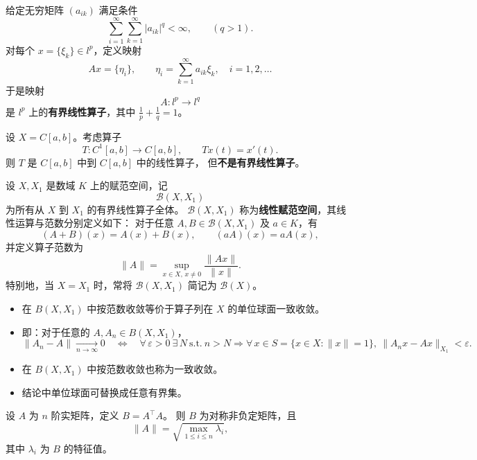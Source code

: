 \begin{example}[例 3.1.3]
给定无穷矩阵 $(a_{ik})$ 满足条件
\[
\sum_{i=1}^{\infty}\sum_{k=1}^{\infty}|a_{ik}|^q<\infty,\qquad (q>1).
\]
对每个 $x=\{\xi_k\}\in l^p$，定义映射
\[
A x = \{\eta_i\},\qquad \eta_i=\sum_{k=1}^{\infty}a_{ik}\xi_k,\quad i=1,2,\dots
\]
于是映射
\[
A:l^p \longrightarrow l^q
\]
是 $l^p$ 上的\textbf{有界线性算子}，其中 $\frac{1}{p}+\frac{1}{q}=1$。
\end{example}

\begin{example}[例 3.1.4（反例）]
设 $X=C[a,b]$。考虑算子
\[
T:C^1[a,b]\to C[a,b],\qquad T x(t)=x'(t).
\]
则 $T$ 是 $C[a,b]$ 中到 $C[a,b]$ 中的线性算子，
但\textbf{不是有界线性算子}。
\end{example}
\begin{definition}[有界线性算子空间]\label{def:bounded-operator-space}
设 $X, X_1$ 是数域 $K$ 上的赋范空间，记
\[
\mathcal{B}(X, X_1)
\]
为所有从 $X$ 到 $X_1$ 的有界线性算子全体。  
$\mathcal{B}(X, X_1)$ 称为\textbf{线性赋范空间}，其线性运算与范数分别定义如下：  
对于任意 $A,B\in\mathcal{B}(X, X_1)$ 及 $a\in K$，有
\[
(A+B)(x)=A(x)+B(x),\qquad (aA)(x)=aA(x),
\]
并定义算子范数为
\[
\|A\|=\sup_{x\in X,\,x\ne0}\frac{\|Ax\|}{\|x\|}.
\]
特别地，当 $X=X_1$ 时，常将 $\mathcal{B}(X,X_1)$ 简记为 $\mathcal{B}(X)$。
\end{definition}
\begin{itemize}
  \item 在 $B(X,X_1)$ 中按范数收敛等价于算子列在 $X$ 的单位球面一致收敛。
  
  \item 即：对于任意的 $A,A_n\in B(X,X_1)$，
  \[
    \|A_n-A\|\xrightarrow[n\to\infty]{}0
    \quad\Longleftrightarrow\quad
    \forall\,\varepsilon>0\ \exists\,N\ \text{s.t.}\ n>N \Rightarrow
    \forall\,x\in S=\{x\in X:\|x\|=1\},\ 
    \|A_nx-Ax\|_{X_1}<\varepsilon .
  \]
  
  \item 在 $B(X,X_1)$ 中按范数收敛也称为一致收敛。
  
  \item 结论中单位球面可替换成任意有界集。
\end{itemize}
\begin{theorem}[对称正定矩阵的算子范数与特征值的关系]
设 $A$ 为 $n$ 阶实矩阵，定义 $B = A^\top A$。  
则 $B$ 为对称非负定矩阵，且
\[
\|A\| = \sqrt{\max_{1\le i\le n}\lambda_i},
\]
其中 $\lambda_i$ 为 $B$ 的特征值。
\end{theorem}

